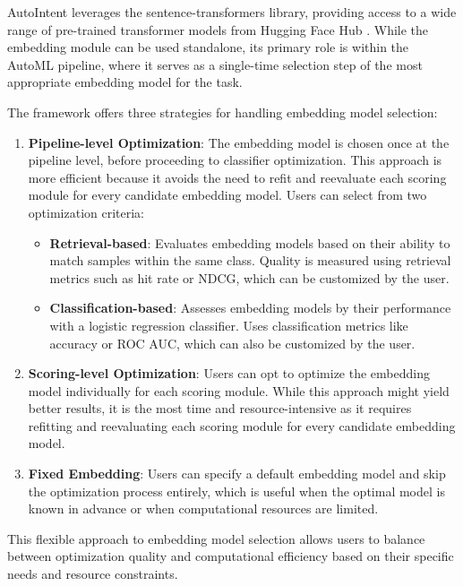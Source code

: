 AutoIntent leverages the sentence-transformers library, providing access to a wide range of pre-trained transformer models from Hugging Face Hub \cite{wolf2020huggingfacestransformersstateoftheartnatural}. While the embedding module can be used standalone, its primary role is within the AutoML pipeline, where it serves as a single-time selection step of the most appropriate embedding model for the task.

The framework offers three strategies for handling embedding model selection:

\begin{enumerate}
    \item \textbf{Pipeline-level Optimization}: The embedding model is chosen once at the pipeline level, before proceeding to classifier optimization. This approach is more efficient because it avoids the need to refit and reevaluate each scoring module for every candidate embedding model. Users can select from two optimization criteria:
    \begin{itemize}
        \item \textbf{Retrieval-based}: Evaluates embedding models based on their ability to match samples within the same class. Quality is measured using retrieval metrics such as hit rate or NDCG, which can be customized by the user.
        \item \textbf{Classification-based}: Assesses embedding models by their performance with a logistic regression classifier. Uses classification metrics like accuracy or ROC AUC, which can also be customized by the user.
    \end{itemize}
    
    \item \textbf{Scoring-level Optimization}: Users can opt to optimize the embedding model individually for each scoring module. While this approach might yield better results, it is the most time and resource-intensive as it requires refitting and reevaluating each scoring module for every candidate embedding model.
    
    \item \textbf{Fixed Embedding}: Users can specify a default embedding model and skip the optimization process entirely, which is useful when the optimal model is known in advance or when computational resources are limited.
\end{enumerate}

This flexible approach to embedding model selection allows users to balance between optimization quality and computational efficiency based on their specific needs and resource constraints.

